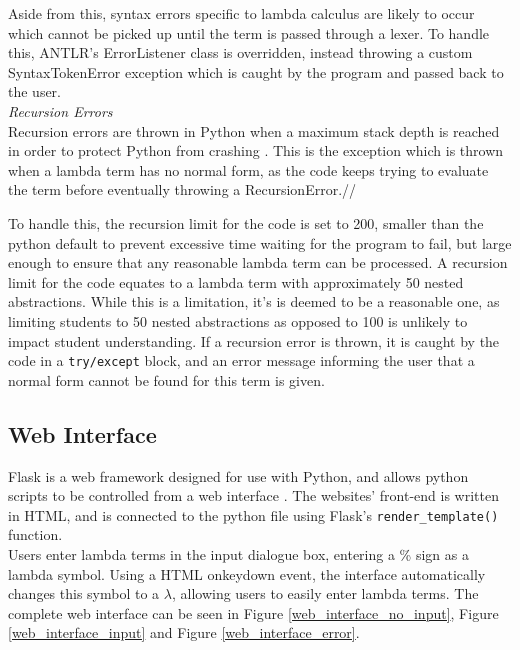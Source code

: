 \documentclass[a4paper,11pt]{report}
\begin{document}
Aside from this, syntax errors specific to lambda calculus are likely to occur which cannot be picked up until the term is passed through a lexer. To handle this, ANTLR's ErrorListener class is overridden, instead throwing a custom SyntaxTokenError exception which is caught by the program and passed back to the user.\\

\textit{Recursion Errors}\\
Recursion errors are thrown in Python when a maximum stack depth is reached in order to protect Python from crashing \cite{PythonStack2019}. This is the exception which is thrown when a lambda term has no normal form, as the code keeps trying to evaluate the term before eventually throwing a RecursionError.//

To handle this, the recursion limit for the code is set to 200, smaller than the python default to prevent excessive time waiting for the program to fail, but large enough to ensure that any reasonable lambda term can be processed. A recursion limit for the code equates to a lambda term with approximately 50 nested abstractions. While this is a limitation, it's is deemed to be a reasonable one, as limiting students to 50 nested abstractions as opposed to 100 is unlikely to impact student understanding. If a recursion error is thrown, it is caught by the code in a \texttt{try/except} block, and an error message informing the user that a normal form cannot be found for this term is given.

\subsection{Web Interface}

Flask is a web framework designed for use with Python, and allows python scripts to be controlled from a web interface \cite{FullStack2019}. The websites' front-end is written in HTML, and is connected to the python file using Flask's \texttt{render_template()} function.\\

Users enter lambda terms in the input dialogue box, entering a \% sign as a lambda symbol. Using a HTML onkeydown event, the interface automatically changes this symbol to a $\lambda$, allowing users to easily enter lambda terms. The complete web interface can be seen in Figure \ref{web_interface_no_input}, Figure \ref{web_interface_input} and Figure \ref{web_interface_error}.\\
\end{document}
